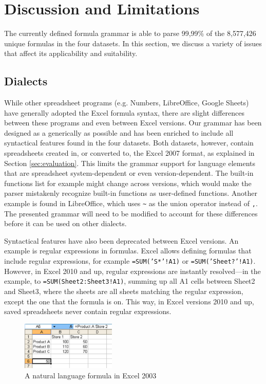 \documentclass[times]{smrauth}
\begin{document}
\section{Discussion and Limitations}
\label{sec:discussion}
The currently defined formula grammar is able to parse 99,99\% of the 8,577,426 unique formulas in the four datasets. In this section, we discuss a variety of issues that affect its applicability and suitability.

\subsection{Dialects}

While other spreadsheet programs (e.g. Numbers, LibreOffice, Google Sheets) have generally adopted the Excel formula syntax, there are slight differences between these programs and even between Excel versions.
Our grammar has been designed as a generically as possible and has been enriched to include all syntactical features found in the four datasets.
Both datasets, however, contain spreadsheets created in, or converted to, the Excel 2007 format, as explained in Section \ref{sec:evaluation}.
This limits the grammar support for language elements that are spreadsheet system-dependent or even version-dependent.
The built-in functions list for example might change across versions, which would make the parser mistakenly recognize built-in functions as user-defined functions.
Another example is found in LibreOffice, which uses \texttt{\~} as the union operator instead of \texttt{,}.
The presented grammar will need to be modified to account for these differences before it can be used on other dialects.

Syntactical features have also been deprecated between Excel versions.
An example is regular expressions in formulas.
Excel allows defining formulas that include regular expressions, for example \texttt{=SUM('S*'!A1)} or \texttt{=SUM('Sheet?'!A1)}.
However, in Excel 2010 and up, regular expressions are instantly resolved---in the example, to  \texttt{=SUM(Sheet2:Sheet3!A1)}, summing up all A1 cells between Sheet2 and Sheet3, where the sheets are all sheets matching the regular expression, except the one that the formula is on.
This way, in Excel versions 2010 and up, saved spreadsheets never contain regular expressions.
\begin{figure}
	\centering
	\includegraphics[width=0.4\textwidth]{img/labels}
	\caption{A natural language formula in Excel 2003}
	\label{fig:labels}
\end{figure}
\end{document}
